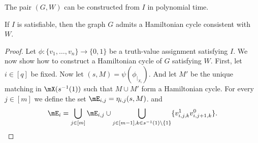 \documentclass[a4paper,UKenglish,cleveref, autoref, thm-restate]{lipics-v2021}
\begin{document}
\begin{observation}
	The pair $(G, W)$ can be constructed from $I$ in polynomial time.
\end{observation}

\begin{claim}
	If $I$ is satisfiable, then the graph $G$ admits a Hamiltonian cycle consistent with~$W$.
\end{claim}
\begin{proof}
	Let $\phi \colon \{v_1, \dots, v_n\} \to \{0, 1\}$ be a truth-value assignment satisfying $I$.
	We now show how to construct a Hamiltonian cycle of $G$ satisfying $W$.
	First, let $i \in [q]$ be fixed. 
	Now let $(s, M) = \psi(\phi_{|_{X_i}})$.
	And let $M'$ be the unique matching in $\mX(s^{-1}(1))$ such that $M \cup M'$ form a Hamiltonian cycle.
	For every $j \in [m]$ we define the set $\mE_{i,j} = \eta_{i,j}(s, M)$.
	and 
	\[
		\mE_i = \bigcup_{j \in [m]} \mE_{i,j} \cup \bigcup_{j \in [m-1], k \in s^{-1}(1) \setminus \{1\}} \{v_{i,j,k}^1 v_{i,j+1,k}^0\}. 
	\]


\end{proof}
\end{document}
